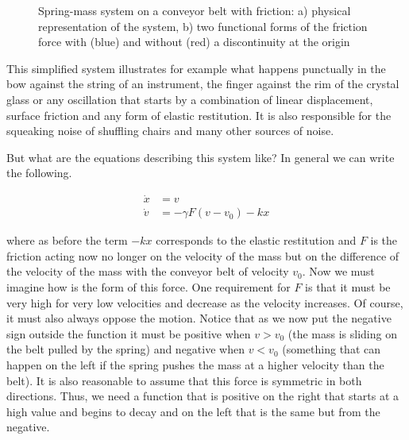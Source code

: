 \documentclass{article}
\begin{document}
\begin{figure}[h]
    \centering
    \caption{Spring-mass system on a conveyor belt with friction: a) physical representation of the system, b) two functional forms of the friction force with (blue) and without (red) a discontinuity at the origin} 
    \label{fig_belt}
\end{figure}

This simplified system illustrates for example what happens punctually in the bow against the string of an instrument, the finger against the rim of the crystal glass or any oscillation that starts by a combination of linear displacement, surface friction and any form of elastic restitution. 
It is also responsible for the squeaking noise of shuffling chairs and many other sources of noise. 

But what are the equations describing this system like? 
In general we can write the following. 


\begin{subequations} \label{eq_bow}
\begin{align}
    \dot{x} & = v \\
    \dot{v} & = - \gamma F(v-v_0) - kx
\end{align}
\end{subequations}

where as before the term $-kx$ corresponds to the elastic restitution and $F$ is the friction acting now no longer on the velocity of the mass but on the difference of the velocity of the mass with the conveyor belt of velocity $v_0$. 
Now we must imagine how is the form of this force. 
One requirement for $F$ is that it must be very high for very low velocities and decrease as the velocity increases. 
Of course, it must also always oppose the motion. 
Notice that as we now put the negative sign outside the function it must be positive when $v>v_0$ (the mass is sliding on the belt pulled by the spring) and negative when $v<v_0$ (something that can happen on the left if the spring pushes the mass at a higher velocity than the belt). 
It is also reasonable to assume that this force is symmetric in both directions. 
Thus, we need a function that is positive on the right that starts at a high value and begins to decay and on the left that is the same but from the negative. 
\end{document}
